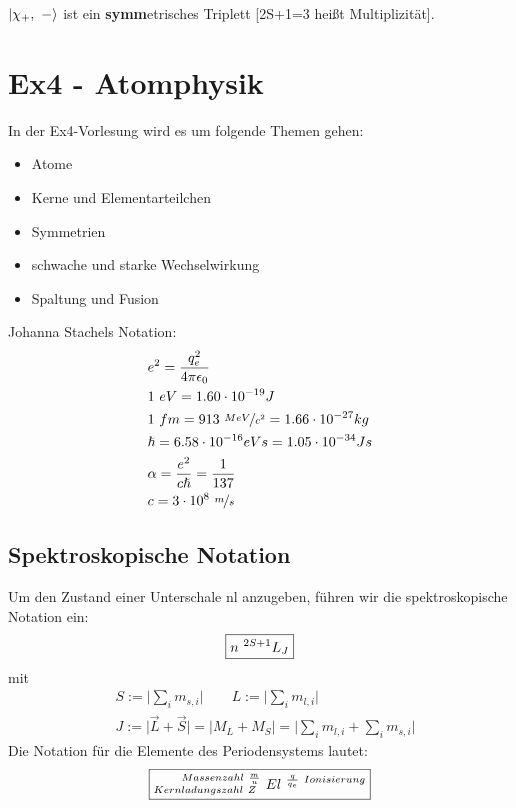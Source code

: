 \documentclass[Ex4_Zusammenfassung.tex]{subfiles}
\begin{document}
$\ket{\chi_+,\ -}$ ist ein \textbf{symm}etrisches Triplett [2S+1=3 heißt Multiplizität].

\chapter{ Ex4 - Atomphysik}

In der Ex4-Vorlesung wird es um folgende Themen gehen:

\begin{itemize}
\item Atome
\item Kerne und Elementarteilchen
\item Symmetrien
\item schwache und starke Wechselwirkung
\item Spaltung und Fusion 
\end{itemize}
Johanna Stachels Notation: 
\begin{align*}
& e^2 = \frac{q_e^2}{4\pi \epsilon_{0}}  \\
& 1 \ eV = 1.60 \cdot 10^{-19} J  \\
& 1 \ fm = 913 \ \nicefrac{MeV}{c^2} = 1.66 \cdot 10^{-27} kg \\
& \hslash = 6.58 \cdot 10^{-16} eVs = 1.05 \cdot 10^{-34} Js \\
&\alpha = \frac {e^2}{c \hslash} = \frac{1}{137} \\
&c = 3 \cdot 10^8 \  \nicefrac{m}{s} \\
\end{align*}

\section{Spektroskopische Notation}
Um den Zustand einer Unterschale nl anzugeben, führen wir die spektroskopische Notation ein: 
\begin{equation}
\centering \boxed{ n \ ^{2S+1}L_J }
\end{equation}
mit
\begin{align*}
&S := \lvert \sum_{i} m_{s,i} \rvert \qquad L:=  \lvert \sum_{i} m_{l,i} \rvert \\
&J := \lvert \vec L + \vec S \rvert   = \lvert M_L + M_S \rvert   = \lvert \sum_{i} m_{l,i} + \sum_{i} m_{s,i}  \rvert 
\end{align*}
\newline
Die Notation für die Elemente des Periodensystems lautet: 
\begin{equation}
\centering \boxed{^{\qquad Massenzahl \  \frac{m}{u} } _{Kernladungszahl \  Z} \  El ^{\ \frac{q}{q_e} \  Ionisierung}} 
\end{equation}
\end{document}
